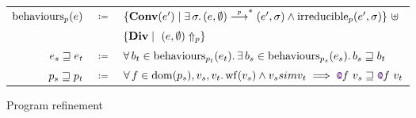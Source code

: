 \begin{figure}[tp]
    \centering
    \\
    \begin{tabular}{rcl}
        	$\mathrm{behaviours}_{\datalangProg} (\datalangExpr)$
        	& $\coloneqq$ &
			$\{ \constr[\datalangExpr']{Conv} \mid \exists \datalangState \ldotp (\datalangExpr, \emptyset) \step{\datalangProg}^* (\datalangExpr', \datalangState) \wedge \mathrm{irreducible}_{\datalangProg} (\datalangExpr', \datalangState) \}\ \uplus$
    	\\
            &&
    		$\{ \constr{Div} \mid\ \diverges{\datalangProg}{(\datalangExpr, \emptyset)} \}$
        \\
            $\datalangExpr_s \refined \datalangExpr_t$
            & $\coloneqq$ &
            $\forall b_t \in \mathrm{behaviours}_{\datalangProg_t} (\datalangExpr_t) \ldotp
            \exists b_s \in \mathrm{behaviours}_{\datalangProg_s} (\datalangExpr_s) \ldotp
            b_s \refined b_t$
        \\
            $\datalangProg_s \refined \datalangProg_t$
            & $\coloneqq$ &
            $\forall \datalangFn \in \dom{\datalangProg_s}, \datalangVal_s, \datalangVal_t \ldotp
            \wf{\datalangVal_s} \wedge \datalangVal_s \similar \datalangVal_t \implies
            \datalangCall{\datalangFnptr{\datalangFn}}{\datalangVal_s} \refined \datalangCall{\datalangFnptr{\datalangFn}}{\datalangVal_t}$
    \end{tabular}
    \caption{Program refinement}
    \label{fig:refinement}
\end{figure}